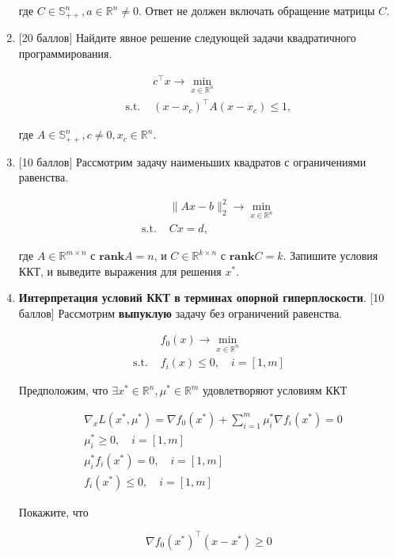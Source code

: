 \documentclass[
  russian,
  letterpaper,
  DIV=11,
  numbers=noendperiod]{scrartcl}
\begin{document}
\begin{enumerate}
  где \(C \in \mathbb{S}^n_{++}, a \in \mathbb{R}^n \neq 0\). Ответ не
  должен включать обращение матрицы \(C\).
\item
  {[}20 баллов{]} Найдите явное решение следующей задачи квадратичного
  программирования.

  \[
   \begin{split}
   & c^\top x \to \min\limits_{x \in \mathbb{R}^n }\\
   \text{s.t. } & (x - x_c)^\top A (x - x_c) \leq 1,
   \end{split}
   \]

  где \(A \in \mathbb{S}^n_{++}, c \neq 0, x_c \in \mathbb{R}^n\).
\item
  {[}10 баллов{]} Рассмотрим задачу наименьших квадратов с ограничениями
  равенства.

  \[
   \begin{split}
   & \|Ax - b\|_2^2 \to \min\limits_{x \in \mathbb{R}^n }\\
   \text{s.t. } & Cx = d,
   \end{split}
   \]

  где \(A \in \mathbb{R}^{m \times n}\) с \(\mathbf{rank }A = n\), и
  \(C \in \mathbb{R}^{k \times n}\) с \(\mathbf{rank }C = k\). Запишите
  условия ККТ, и выведите выражения для решения \(x^*\).
\item
  \textbf{Интерпретация условий ККТ в терминах опорной гиперплоскости}.
  {[}10 баллов{]} Рассмотрим \textbf{выпуклую} задачу без ограничений
  равенства.

  \[
   \begin{split}
   & f_0(x) \to \min\limits_{x \in \mathbb{R}^n }\\
   \text{s.t. } & f_i(x) \leq 0, \quad i = [1,m]
   \end{split}
   \]

  Предположим, что
  \(\exists x^* \in \mathbb{R}^n, \mu^* \in \mathbb{R}^m\) удовлетворяют
  условиям ККТ

  \[
   \begin{split}
   & \nabla_x L (x^*, \mu^*) = \nabla f_0(x^*) + \sum\limits_{i=1}^m\mu_i^*\nabla f_i(x^*) = 0 \\
   & \mu^*_i \geq 0, \quad i = [1,m] \\
   & \mu^*_i f_i(x^*) = 0, \quad i = [1,m]\\
   & f_i(x^*) \leq 0, \quad i = [1,m]
   \end{split}
   \]

  Покажите, что

  \[
   \nabla f_0(x^*)^\top (x - x^*) \geq 0
   \]


\end{enumerate}
\end{document}
